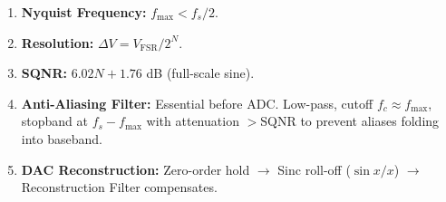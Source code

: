 \documentclass[11pt]{article}
\begin{document}
\begin{methode}
\begin{enumerate}
\item \textbf{Nyquist Frequency:} $f_{\max} < f_s/2$.
\item \textbf{Resolution:} $\Delta V = V_{\mathrm{FSR}} / 2^N$.
\item \textbf{SQNR:} $6.02N + 1.76$ dB (full-scale sine).
\item \textbf{Anti-Aliasing Filter:} Essential before ADC. Low-pass, cutoff $f_c \approx f_{\max}$, stopband at $f_s - f_{\max}$ with attenuation $> \mathrm{SQNR}$ to prevent aliases folding into baseband.
\item \textbf{DAC Reconstruction:} Zero-order hold $\to$ Sinc roll-off ($\sin x/x$) $\to$ Reconstruction Filter compensates.
\end{enumerate}
\end{methode}
\end{document}
